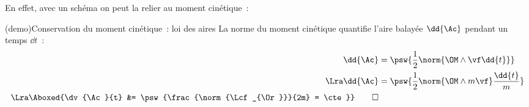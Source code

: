 \documentclass[../../main/main.tex]{subfiles}
\begin{document}
En effet, avec un schéma on peut la relier au moment cinétique~:
\begin{tcb*}[sidebyside](demo){Conservation du moment cinétique~: loi des aires}
  La norme du moment cinétique quantifie l'aire balayée $\dd{\Ac}$ pendant un
  temps $\dd{t}$~:
  \begin{align*}
    \dd{\Ac} &= \psw{\frac{1}{2}\norm{\OM \wedge \vf \dd{t}}}
    \\\Lra
    \dd{\Ac} &= \psw{\frac{1}{2}\norm{\OM \wedge m \vf} \frac{\dd{t}}{m}}
    \\\Lra
    \Aboxed{\dv{\Ac}{t} &= \psw{\frac{\norm{\Lcf_{\Or}}}{2m} = \cte}}
    \qed
  \end{align*}
  \tcblower
		\begin{center}
\end{center}
\end{tcb*}
\end{document}
